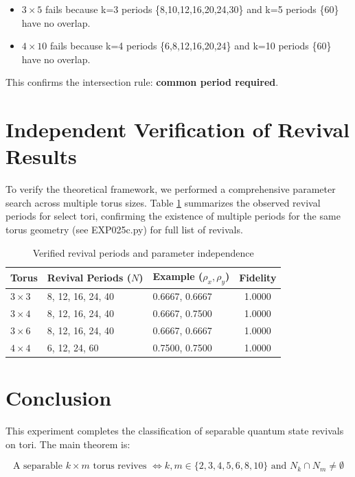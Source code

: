 \documentclass[12pt]{article}
\begin{document}
\begin{itemize}
    \item \(3 \times 5\) fails because k=3 periods \{8,10,12,16,20,24,30\} and k=5 periods \{60\} have no overlap.
    \item \(4 \times 10\) fails because k=4 periods \{6,8,12,16,20,24\} and k=10 periods \{60\} have no overlap.
\end{itemize}

This confirms the intersection rule: \textbf{common period required}.

\section{Independent Verification of Revival Results}

To verify the theoretical framework, we performed a comprehensive parameter search across multiple torus sizes. Table \ref{tab:verification_summary} summarizes the observed revival periods for select tori, confirming the existence of multiple periods for the same torus geometry (see EXP025c.py) \cite{exp025} for full list of revivals.

\begin{table}[h!]
\centering
\caption{Verified revival periods and parameter independence}
\label{tab:verification_summary}
\begin{tabular}{lllc}
\toprule
\textbf{Torus} & \textbf{Revival Periods ($N$)} & \textbf{Example ($\rho_x, \rho_y$)} & \textbf{Fidelity} \\
\midrule
$3 \times 3$ & 8, 12, 16, 24, 40 & 0.6667, 0.6667 & 1.0000 \\
$3 \times 4$ & 8, 12, 16, 24, 40 & 0.6667, 0.7500 & 1.0000 \\
$3 \times 6$ & 8, 12, 16, 24, 40 & 0.6667, 0.6667 & 1.0000 \\
$4 \times 4$ & 6, 12, 24, 60 & 0.7500, 0.7500 & 1.0000 \\
\bottomrule
\end{tabular}
\end{table}

\section{Conclusion}

This experiment completes the classification of separable quantum state revivals on tori. The main theorem is:

\[
\boxed{\text{A separable } k \times m \text{ torus revives } \iff k,m \in \{2,3,4,5,6,8,10\} \text{ and } N_k \cap N_m \neq \emptyset}
\]
\end{document}
